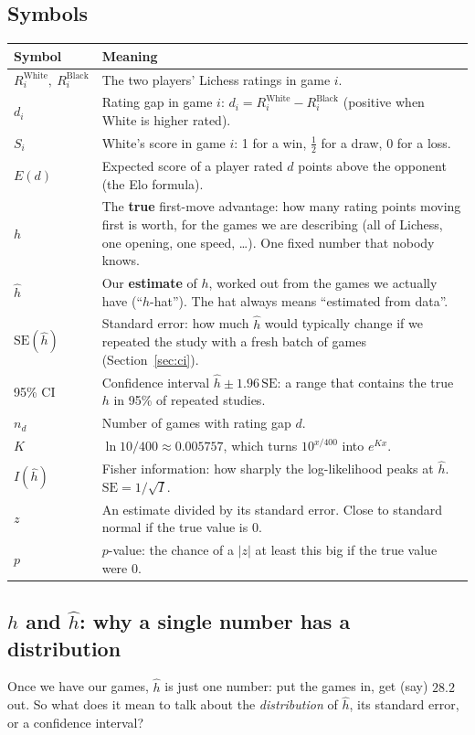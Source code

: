 \documentclass[11pt,a4paper]{article}
\begin{document}
\subsection{Symbols}
\begin{center}
\small
\begin{tabularx}{\linewidth}{@{}lX@{}}
\toprule
Symbol & Meaning \\
\midrule
$R^{\text{White}}_i,\ R^{\text{Black}}_i$ & The two players' Lichess ratings in game $i$. \\
$d_i$ & Rating gap in game $i$: $d_i = R^{\text{White}}_i - R^{\text{Black}}_i$ (positive when White is higher rated). \\
$S_i$ & White's score in game $i$: 1 for a win, $\tfrac12$ for a draw, 0 for a loss. \\
$E(d)$ & Expected score of a player rated $d$ points above the opponent (the Elo formula). \\
$h$ & The \textbf{true} first-move advantage: how many rating points moving first is worth, for the
  games we are describing (all of Lichess, one opening, one speed, \dots). One fixed number that
  nobody knows. \\
$\hat h$ & Our \textbf{estimate} of $h$, worked out from the games we actually have
  (``$h$-hat''). The hat always means ``estimated from data''. \\
$\mathrm{SE}(\hat h)$ & Standard error: how much $\hat h$ would typically change if we repeated the
  study with a fresh batch of games (Section~\ref{sec:ci}). \\
95\% CI & Confidence interval $\hat h \pm 1.96\,\mathrm{SE}$: a range that contains the true $h$ in
  95\% of repeated studies. \\
$n_d$ & Number of games with rating gap $d$. \\
$K$ & $\ln 10 / 400 \approx 0.005757$, which turns $10^{x/400}$ into $e^{Kx}$. \\
$I(\hat h)$ & Fisher information: how sharply the log-likelihood peaks at $\hat h$. $\mathrm{SE} = 1/\sqrt{I}$. \\
$z$ & An estimate divided by its standard error. Close to standard normal if the true value is 0. \\
$p$ & $p$-value: the chance of a $|z|$ at least this big if the true value were 0. \\
\bottomrule
\end{tabularx}
\end{center}

\subsection{$h$ and $\hat h$: why a single number has a distribution}
Once we have our games, $\hat h$ is just one number: put the games in, get (say) $28.2$ out. So
what does it mean to talk about the \emph{distribution} of $\hat h$, its standard error, or a
confidence interval?
\end{document}

